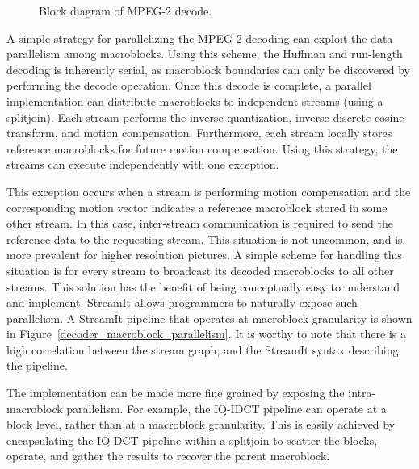 \begin{figure}[htbp]
\centerline{}
\caption{Block diagram of MPEG-2 decode.}
\label{fig:dec_block}
\end{figure}

\clearpage
A simple strategy for parallelizing the MPEG-2 decoding can exploit
the data parallelism among macroblocks. Using this scheme, the Huffman
and run-length decoding is inherently serial, as macroblock boundaries
can only be discovered by performing the decode operation.  Once this
decode is complete, a parallel implementation can distribute
macroblocks to independent streams (using a splitjoin). Each stream
performs the inverse quantization, inverse discrete cosine transform,
and motion compensation. Furthermore, each stream locally stores
reference macroblocks for future motion compensation. Using this
strategy, the streams can execute independently with one exception.

\begin{figure*}[t]
\vspace{-12pt}
\caption{An MPEG-2 Decoder exploiting macroblock parallelism.}
\label{decoder_macroblock_parallelism}
\vspace{-6pt}
\end{figure*}

This exception occurs when a stream is performing motion compensation
and the corresponding motion vector indicates a reference macroblock
stored in some other stream. In this case, inter-stream communication
is required to send the reference data to the requesting stream. This
situation is not uncommon, and is more prevalent for higher resolution
pictures. A simple scheme for handling this situation is for every
stream to broadcast its decoded macroblocks to all other streams. This
solution has the benefit of being conceptually easy to understand and
implement. StreamIt allows programmers to naturally expose such
parallelism. A StreamIt pipeline that operates at macroblock
granularity is shown in Figure~\ref{decoder_macroblock_parallelism}. It is
worthy to note that there is a high correlation between the stream
graph, and the StreamIt syntax describing the pipeline.

The implementation can be made more fine grained by exposing the
intra-macroblock parallelism. For example, the IQ-IDCT pipeline can
operate at a block level, rather than at a macroblock
granularity. This is easily achieved by encapsulating the IQ-DCT pipeline
within a splitjoin to scatter the blocks, operate, and gather the
results to recover the parent macroblock.


